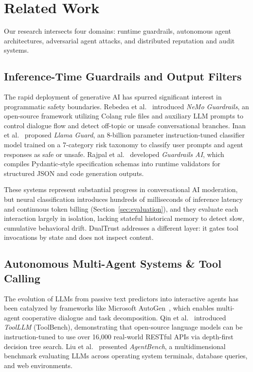 \documentclass[manuscript, screen, review]{jair}
\begin{document}
\section{Related Work}
\label{sec:related_work}

Our research intersects four domains: runtime guardrails, autonomous agent architectures, adversarial agent attacks, and distributed reputation and audit systems.

\subsection{Inference-Time Guardrails and Output Filters}
The rapid deployment of generative AI has spurred significant interest in programmatic safety boundaries. Rebedea et al.~\cite{rebedea2023nemo} introduced \emph{NeMo Guardrails}, an open-source framework utilizing Colang rule files and auxiliary LLM prompts to control dialogue flow and detect off-topic or unsafe conversational branches. Inan et al.~\cite{inan2023llama} proposed \emph{Llama Guard}, an 8-billion parameter instruction-tuned classifier model trained on a 7-category risk taxonomy to classify user prompts and agent responses as safe or unsafe. Rajpal et al.~\cite{rajpal2024guardrails} developed \emph{Guardrails AI}, which compiles Pydantic-style specification schemas into runtime validators for structured JSON and code generation outputs.

These systems represent substantial progress in conversational AI moderation, but neural classification introduces hundreds of milliseconds of inference latency and continuous token billing (Section~\ref{sec:evaluation}), and they evaluate each interaction largely in isolation, lacking stateful historical memory to detect slow, cumulative behavioral drift. DualTrust addresses a different layer: it gates tool invocations by state and does not inspect content.

\subsection{Autonomous Multi-Agent Systems \& Tool Calling}
The evolution of LLMs from passive text predictors into interactive agents has been catalyzed by frameworks like Microsoft AutoGen~\cite{wu2023autogen}, which enables multi-agent cooperative dialogue and task decomposition. Qin et al.~\cite{qin2024toolllm} introduced \emph{ToolLLM} (ToolBench), demonstrating that open-source language models can be instruction-tuned to use over 16,000 real-world RESTful APIs via depth-first decision tree search. Liu et al.~\cite{liu2024agentbench} presented \emph{AgentBench}, a multidimensional benchmark evaluating LLMs across operating system terminals, database queries, and web environments.
\end{document}
